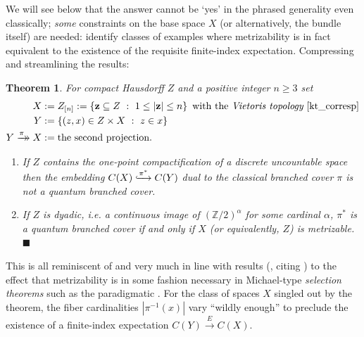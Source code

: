 \documentclass[11pt,leqno]{article}
\theoremstyle{plain}
\theoremstyle{plain}
\newtheorem{theoremN}{Theorem}
\theoremstyle{plain}
\numberwithin{equation}{section}
\theoremstyle{nonumberplain}
\newcommand\bZ{{\mathbb Z}}
\newcommand\1{{\bf 1}}
\newcommand{\qedhere}{\mbox{}\hfill\ensuremath{\blacksquare}}
\newcommand{\xrightarrowdbl}[2][]{%
  \xrightarrow[#1]{#2}\mathrel{\mkern-14mu}\rightarrow
}
\begin{document}
We will see below that the answer cannot be `yes' in the phrased generality even classically; {\it some} constraints on the base space $X$ (or alternatively, the bundle itself) are needed:  identify classes of examples where metrizability is in fact equivalent to the existence of the requisite finite-index expectation. Compressing and streamlining the results:

\begin{theoremN}\label{thn:metr.needed.dyad}
  For compact Hausdorff $Z$ and a positive integer $n\ge 3$ set
  \begin{equation*}
    \begin{aligned}
      X&:=Z_{[n]}:=\left\{{\bf z}\subseteq Z\ :\ 1\le |{\bf z}|\le n\right\}\text{ with the {\it Vietoris topology} \cite[Definition 1.3.3]{kt_corresp}}\\
      Y&:=\left\{(z,x)\in Z\times X\ :\ z\in x\right\}\\
      Y\xrightarrowdbl{\pi}X
       &:=\text{the second projection}. 
    \end{aligned}    
  \end{equation*}

  \begin{enumerate}[(1),wide]
  \item If $Z$ contains the {\it one-point compactification} \cite[Definition 19.2]{wil_top} of a discrete uncountable space then the embedding $C(X)\lhook\joinrel\xrightarrow{\pi^*}C(Y)$ dual to the classical branched cover $\pi$ is not a quantum branched cover. 

  \item If $Z$ is {\it dyadic}, i.e. \cite[Problem 3.12.12]{eng_top_1989} a continuous image of $(\bZ/2)^{\alpha}$ for some cardinal $\alpha$, $\pi^*$ is a quantum branched cover if and only if $X$ (or equivalently, $Z$) is metrizable.  \qedhere
  \end{enumerate}
\end{theoremN}

This is all reminiscent of and very much in line with results (\cite[Theorem 5.2]{rs_cont-sel}, citing \cite[Theorem 2]{zbMATH03569401}) to the effect that metrizability is in some fashion necessary in Michael-type {\it selection theorems} such as the paradigmatic \cite[Theorem 3.2'']{mich_contsel-1}. For the class of spaces $X$ singled out by the theorem, the fiber cardinalities $|\pi^{-1}(x)|$ vary ``wildly enough'' to preclude the existence of a finite-index expectation $C(Y)\xrightarrow{E}C(X)$. 
\end{document}
